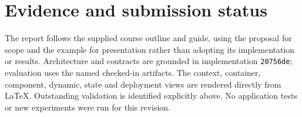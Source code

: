 \documentclass[11pt,a4paper]{article}
\begin{document}
\section*{Evidence and submission status}
The report follows the supplied course outline and guide, using the proposal for scope and the example for presentation rather than adopting its implementation or results. Architecture and contracts are grounded in implementation \texttt{20756de}; evaluation uses the named checked-in artifacts. The context, container, component, dynamic, state and deployment views are rendered directly from LaTeX. Outstanding validation is identified explicitly above. No application tests or new experiments were run for this revision.
\end{document}
